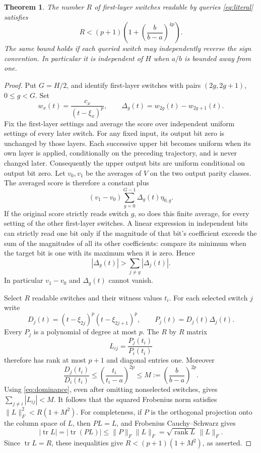 \documentclass[11pt]{article}
\newtheorem{theorem}{Theorem}
\begin{document}
\begin{theorem}\label{thm:firstlayer}
The number $R$ of first-layer switches readable by queries
\eqref{eq:literal} satisfies
\[
 R<(p+1)\left(1+\left(\frac b{b-a}\right)^{4p}\right).
 \tag{3}\label{eq:bound}
\]
The same bound holds if each queried switch may independently reverse
the sign convention. In particular it is independent of $H$ when
$a/b$ is bounded away from one.
\end{theorem}
\begin{proof}
Put $G=H/2$, and identify first-layer switches with pairs
$(2g,2g+1)$, $0\leq g<G$. Set
\[
 w_x(t)=\frac{c_x}{(t-\xi_x)^p},\qquad
 \Delta_g(t)=w_{2g}(t)-w_{2g+1}(t).
\]
Fix the first-layer settings and average the score over independent
uniform settings of every later switch. For any fixed input, its
output bit zero is unchanged by those layers. Each successive upper
bit becomes uniform when its own layer is applied, conditionally on
the preceding trajectory, and is never changed later. Consequently
the upper output bits are uniform conditional on output bit zero.
Let $v_0,v_1$ be the averages of $V$ on the two output parity classes.
The averaged score is therefore a constant plus
\[
 (v_1-v_0)\sum_{g=0}^{G-1}\Delta_g(t)\eta_{0,g}.
\]
If the original score strictly reads switch $g$, so does this finite
average, for every setting of the other first-layer switches. A
linear expression in independent bits can strictly read one bit
only if the magnitude of that bit's coefficient exceeds the sum of
the magnitudes of all its other coefficients: compare its minimum
when the target bit is one with its maximum when it is zero. Hence
\[
 |\Delta_g(t)|>\sum_{j\ne g}|\Delta_j(t)|.
 \tag{4}\label{eq:dominance}
\]
In particular $v_1-v_0$ and $\Delta_g(t)$ cannot vanish.

Select $R$ readable switches and their witness values $t_i$. For each
selected switch $j$ write
\[
 D_j(t)=(t-\xi_{2j})^p(t-\xi_{2j+1})^p,
 \qquad P_j(t)=D_j(t)\Delta_j(t).
\]
Every $P_j$ is a polynomial of degree at most $p$. The $R$ by $R$
matrix
\[
 L_{ij}=\frac{P_j(t_i)}{P_i(t_i)}
\]
therefore has rank at most $p+1$ and diagonal entries one. Moreover
\[
 \frac{D_j(t_i)}{D_i(t_i)}
 \leq\left(\frac{t_i}{t_i-a}\right)^{2p}
 \leq M:=\left(\frac b{b-a}\right)^{2p}.
\]
Using \eqref{eq:dominance}, even after omitting nonselected switches,
gives $\sum_{j\ne i}|L_{ij}|<M$. It follows that the squared
Frobenius norm satisfies $\|L\|_F^2<R(1+M^2)$.
For completeness, if $P$ is the orthogonal projection onto the
column space of $L$, then $PL=L$, and Frobenius Cauchy--Schwarz gives
\[
 |\operatorname{tr}L|=|\operatorname{tr}(PL)|
 \leq\|P\|_F\|L\|_F
 =\sqrt{\operatorname{rank}L}\,\|L\|_F.
\]
Since $\operatorname{tr}L=R$, these inequalities give
$R<(p+1)(1+M^2)$, as asserted.
\end{proof}
\end{document}
